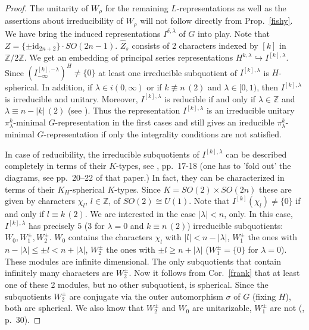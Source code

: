 \documentclass[10]{amsart}
\theoremstyle{remark}
\theoremstyle{definition}
\numberwithin{equation}{section}
\newcommand{\R}{\mathbb{R}}           %
\newcommand{\Z}{\mathbb{Z}}         %
\newcommand{\id}{\mathrm{id}}
\newcommand{\sgn}{{\mathrm{sgn}}}
\newcommand{\gt}{\theta}
\newcommand{\vp}{\varphi}
\begin{document}
{\begin{proof}
The unitarity of $W_\rho$ for the remaining $L$-representations as well as the assertions about irreducibility of $W_\rho$ will not follow directly from  Prop.~\ref{fishy}.
We have bring the induced representations $I^{\delta,\lambda}$ of $G$ into play. Note that $Z=\{\pm\id_{2n+2}\}\cdot SO(2n-1)$. $\widehat Z_s$ consists of 2 characters indexed by $[k]$
in $\Z/2\Z$.  We get an embedding of principal series
representations $H^{k,\lambda}\hookrightarrow  I^{[k],\lambda}$. 
Since $ (I^{[k],-\lambda}_{-\infty})^H\ne\{0\}$  at least one irreducible subquotient of  $ I^{[k],\lambda}$ is $H$-spherical.
In addition, if $\lambda\in i(0,\infty)$ or if $k\not\equiv n\, (2)$ and $\lambda\in [0,1)$, then  $I^{[k],\lambda}$ is irreducible and unitary.
Moreover,  $ I^{[k],\lambda}$  is reducible if and only if $\lambda\in\Z$ and $\lambda\equiv n-|k| \, (2)$ (see \cite{HoTa93}). Thus the representation 
$ I^{[k],\lambda}$ is an irreducible unitary $\pi^k_\lambda$-minimal $G$-representation in the first cases and still gives an ireducible $\pi^k_\lambda$-minimal $G$-representation if only the integrality conditions are not satisfied.


In case of reducibility, the irreducible subquotients of $I^{[k],\lambda}$ can be described completely in terms of their $K$-types, see \cite{HoTa93}, pp.~17-18 (one has to 'fold out' the diagrams, see pp.~20--22 of that paper.) In fact, they can be characterized in terms
of their $K_H$-spherical $K$-types. Since $K=SO(2)\times SO(2n)$ these are given by characters $\chi_l$, $l\in\Z$, of $SO(2)\cong U(1)$. Note that $I^{[k]}(\chi_l)\ne\{0\}$ if and only if $l\equiv k   \, (2)$. We are interested in the case $|\lambda|<n$,
only. In this case, $I^{[k],\lambda}$ has precisely $5$ ($3$ for $\lambda=0$ and $k\equiv n\, (2)$) irreducible subquotients: $W_0, W_1^\pm, W_2^\pm$. $W_0$ contains the characters $\chi_l$ with 
$|l|< n-|\lambda|$, $W_1^\pm$ the ones with $n-|\lambda|\le\pm l<n+|\lambda|$, $W_2^\pm$ the ones with $\pm l \ge n+|\lambda|$ ($W_1^\pm=\{0\}$ for $\lambda=0$).
These modules are infinite dimensional. The only subquotients that contain infinitely many characters are $W^\pm_2$. Now it follows from Cor.~\ref{frank} that at least one of these 2 modules, but no other subquotient, is spherical. Since the subquotients $W^\pm_2$ are conjugate via the outer automorphism $\sigma$ of $G$ (fixing $H$), both are spherical.
We also know that $W_2^\pm$ and $W_0$ are unitarizable, $W_1^\pm$ are not (\cite{HoTa93}, p.~30).







\end{proof}}
\end{document}
